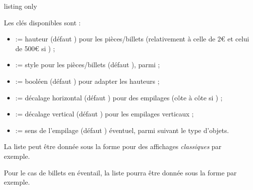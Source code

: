 \documentclass[11pt,a4paper]{ltxdoc}
\begin{document}
\begin{DemoCode}{listing only}
\end{DemoCode}

Les clés disponibles sont :

\begin{itemize}
	\item {} := hauteur (défaut \MontreCode{2cm}) pour les pièces/billets (relativement à celle de 2€ et celui de 500€ si ) ;
	\item {} := style pour les pièces/billets (défaut ), parmi  ;
	\item {} := booléen (défaut ) pour adapter les hauteurs ;
	\item {} := décalage horizontal (défaut \MontreCode{0pt}) pour des empilages (côte à côte si \MontreCode{0pt}) ;
	\item {} := décalage vertical (défaut \MontreCode{5mm}) pour les empilages verticaux ;
	\item {} := sens de l'empilage (défaut ) éventuel, parmi  suivant le type d'objets.
\end{itemize}

La liste peut être donnée sous la forme  pour des affichages \textit{classiques} par exemple.

Pour le cas de billets en éventail, la liste pourra être donnée sous la forme  par exemple.

\begin{DemoCode}{}
%
\end{DemoCode}

\begin{DemoCode}{}
\end{DemoCode}

\begin{DemoCode}{}
\end{DemoCode}
\end{document}
